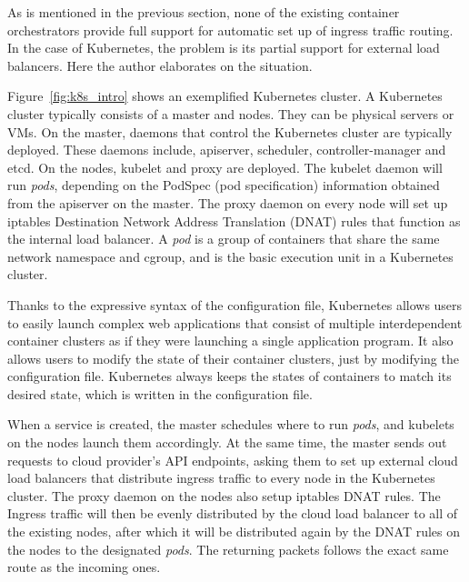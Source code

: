 As is mentioned in the previous section, none of the existing container orchestrators provide full support for automatic set up of ingress traffic routing.
In the case of Kubernetes, the problem is its partial support for external load balancers.
Here the author elaborates on the situation.

Figure~\ref{fig:k8s_intro} shows an exemplified Kubernetes cluster.
A Kubernetes cluster typically consists of a master and nodes. They can be physical servers or VMs.
On the master, daemons that control the Kubernetes cluster are typically deployed. 
These daemons include, apiserver, scheduler, controller-manager and etcd. 
On the nodes, kubelet and proxy are deployed.
The kubelet daemon will run {\it pods}, depending on the PodSpec (pod specification) information obtained from the apiserver on the master.
The proxy daemon on every node will set up iptables Destination Network Address Translation (DNAT) rules that function as the internal load balancer.
A {\em pod} is a group of containers that share the same network namespace and cgroup,
and is the basic execution unit in a Kubernetes cluster.

Thanks to the expressive syntax of the configuration file, Kubernetes allows users to easily launch complex web applications that consist of multiple interdependent container clusters as if they were launching a single application program.
It also allows users to modify the state of their container clusters, just by modifying the configuration file.
Kubernetes always keeps the states of containers to match its desired state, which is written in the configuration file.

When a service is created, the master schedules where to run {\em pods}, and kubelets on the nodes launch them accordingly.
At the same time, the master sends out requests to cloud provider's API endpoints, asking them to set up external cloud load balancers that distribute ingress traffic to every node in the Kubernetes cluster.
The proxy daemon on the nodes also setup iptables DNAT\cite{MartinA.Brown2017} rules. 
The Ingress traffic will then be evenly distributed by the cloud load balancer to all of the existing nodes, 
after which it will be distributed again by the DNAT rules on the nodes to the designated {\em pods}. 
The returning packets follows the exact same route as the incoming ones.

